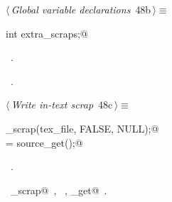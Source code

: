 \documentclass[a4paper]{report}
\begin{document}
\begin{flushleft} \small
\begin{minipage}{\linewidth}\label{scrap90}\raggedright\small
{} $\langle\,${\it Global variable declarations}\nobreak\ {\footnotesize {48b}}$\,\rangle\equiv$
\vspace{-1ex}
\begin{list}{}{} \item
\mbox{}\verb@extern int extra_scraps;@\\
\mbox{}\verb@@{\NWsep}
\end{list}
\vspace{-1.5ex}
\footnotesize
\begin{list}{}{\setlength{\itemsep}{-\parsep}\setlength{\itemindent}{-\leftmargin}}
\item \NWtxtMacroDefBy\ .
\item \NWtxtMacroRefIn\ .

\item{}
\end{list}
\end{minipage}\vspace{4ex}
\end{flushleft}
\begin{flushleft} \small
\begin{minipage}{\linewidth}\label{scrap91}\raggedright\small
{} $\langle\,${\it Write in-text scrap}\nobreak\ {\footnotesize {48c}}$\,\rangle\equiv$
\vspace{-1ex}
\begin{list}{}{} \item
\mbox{}\verb@copy_scrap(tex_file, FALSE, NULL);@\\
\mbox{}\verb@c = source_get();@\\
\mbox{}\verb@@{\NWsep}
\end{list}
\vspace{-1.5ex}
\footnotesize
\begin{list}{}{\setlength{\itemsep}{-\parsep}\setlength{\itemindent}{-\leftmargin}}
\item \NWtxtMacroRefIn\ .
\item \NWtxtIdentsUsed\nobreak\  \verb@copy_scrap@\nobreak\ , \verb@FALSE@\nobreak\ , \verb@source_get@\nobreak\ .
\item{}
\end{list}
\end{minipage}\vspace{4ex}
\end{flushleft}
\end{document}
